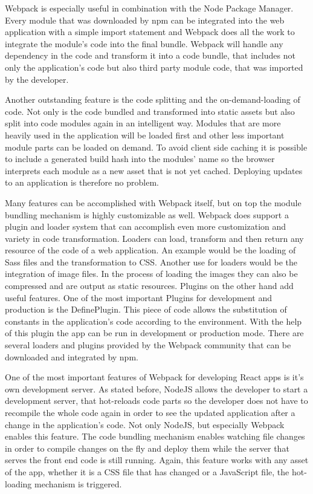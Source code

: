 \mbox{Webpack} is especially useful in combination with the Node Package Manager. Every module that was downloaded by npm can be integrated into the web application with a simple import statement and \mbox{Webpack} does all the work to integrate the module's code into the final bundle. \mbox{Webpack} will handle any dependency in the code and transform it into a code bundle, that includes not only the application's code but also third party module code, that was imported by the developer.

Another outstanding feature is the code splitting and the on-demand-loading of code. Not only is the code bundled and transformed into static assets but also split into code modules again in an intelligent way. Modules that are more heavily used in the application will be loaded first and other less important module parts can be loaded on demand. To avoid client side caching it is possible to include a generated build hash into the modules' name so the browser interprets each module as a new asset that is not yet cached. Deploying updates to an application is therefore no problem.

Many features can be accomplished with \mbox{Webpack} itself, but on top the module bundling mechanism is highly customizable as well. Webpack does support a plugin and loader system that can accomplish even more customization and variety in code transformation. Loaders can load, transform and then return any resource of the code of a web application. An example would be the loading of Sass files and the transformation to CSS. Another use for loaders would be the integration of image files. In the process of loading the images they can also be compressed and are output as static resources. Plugins on the other hand add useful features. One of the most important Plugins for development and production is the \mbox{DefinePlugin}. This piece of code allows the substitution of constants in the application's code according to the environment. With the help of this plugin the app can be run in development or production mode. There are several loaders and plugins provided by the Webpack community that can be downloaded and integrated by npm.

One of the most important features of Webpack for developing React apps is it's own development server. As stated before, NodeJS allows the developer to start a development server, that hot-reloads code parts so the developer does not have to recompile the whole code again in order to see the updated application after a change in the application's code. Not only NodeJS, but especially Webpack enables this feature. The code bundling mechanism enables watching file changes in order to compile changes on the fly and deploy them while the server that serves the front end code is still running. Again, this feature works with any asset of the app, whether it is a CSS file that has changed or a JavaScript file, the hot-loading mechanism is triggered.

